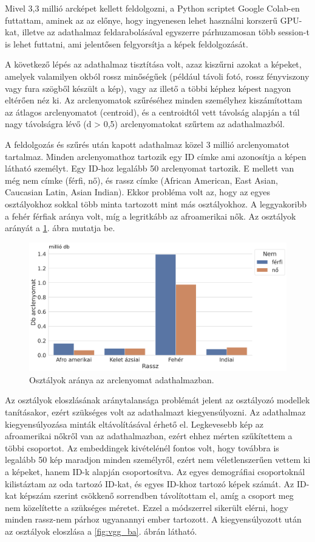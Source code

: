 Mivel 3,3 millió arcképet kellett feldolgozni, a Python scriptet Google Colab-en futtattam, aminek az az előnye, hogy ingyenesen lehet használni korszerű GPU-kat, illetve az adathalmaz feldarabolásával egyszerre párhuzamosan több session-t is lehet futtatni, ami jelentősen felgyorsítja a képek feldolgozását.

A következő lépés az adathalmaz tisztítása volt, azaz kiszűrni azokat a képeket, amelyek valamilyen okból rossz minőségűek (például távoli fotó, rossz fényviszony vagy fura szögből készült a kép), vagy az illető a többi képhez képest nagyon eltérően néz ki. Az arclenyomatok szűréséhez minden személyhez kiszámítottam az átlagos arclenyomatot (centroid), és a centroidtól vett távolság alapján a túl nagy távolságra lévő (d > 0,5) arclenyomatokat szűrtem az adathalmazból. 

A feldolgozás és szűrés után kapott adathalmaz közel 3 millió arclenyomatot tartalmaz. Minden arclenyomathoz tartozik egy ID címke ami azonosítja a képen látható személyt. Egy ID-hoz legalább 50 arclenyomat tartozik. E mellett van még nem címke (férfi, nő), és rassz címke (African American, East Asian, Caucasian Latin, Asian Indian). Ekkor probléma volt az, hogy az egyes osztályokhoz sokkal több minta tartozott mint más osztályokhoz. A leggyakoribb a fehér férfiak aránya volt, míg a legritkább az afroamerikai nők. Az osztályok arányát a \ref{fig:vgg_imba}. ábra mutatja be.

\begin{figure}[ht]
	\centering
	\includegraphics[width=1\columnwidth]{figures/VGG_imba.png}
	\caption{Osztályok aránya az arclenyomat adathalmazban.}
	\label{fig:vgg_imba}
\end{figure}

Az osztályok eloszlásának aránytalansága problémát jelent az osztályozó modellek tanításakor, ezért szükséges volt az adathalmazt kiegyensúlyozni. Az adathalmaz kiegyensúlyozása minták eltávolításával érhető el. Legkevesebb kép az afroamerikai nőkről van az adathalmazban, ezért ehhez mérten szűkítettem a többi csoportot. Az embeddingek kivételénél fontos volt, hogy továbbra is legalább 50 kép maradjon minden személyről, ezért nem véletlenszerűen vettem ki a képeket, hanem ID-k alapján csoportosítva. Az egyes demográfiai csoportoknál kilistáztam az oda tartozó ID-kat, és egyes ID-khoz tartozó képek számát. Az ID-kat képszám szerint csökkenő sorrendben távolítottam el, amíg a csoport meg nem közelítette a szükséges méretet. Ezzel a módszerrel sikerült elérni, hogy minden rassz-nem párhoz ugyanannyi ember tartozott. A kiegyensúlyozott után az osztályok eloszlása a \ref{fig:vgg_ba}. ábrán látható.


